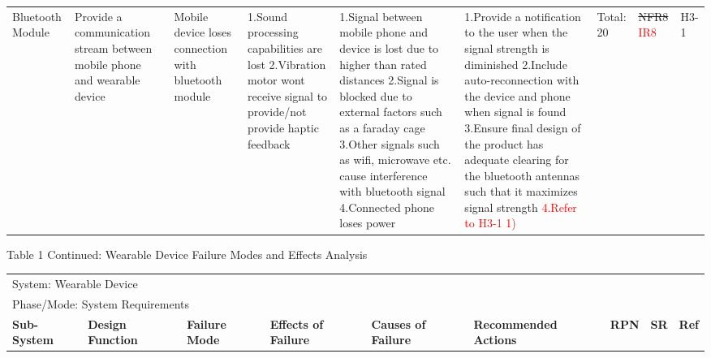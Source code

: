 \documentclass[12pt, titlepage]{article}
\begin{document}
\begin{landscape}
\begin{table}[H]
\begin{tabular}{| p{} | p{}  | p{} | p{} | p{} | p{} | p{} | p{} | p{} |}
         Bluetooth Module & Provide a communication stream between mobile phone and wearable device & Mobile device loses connection with  bluetooth module & 1.Sound processing capabilities are lost \newline 2.Vibration motor wont receive signal to provide/not provide haptic feedback  & 1.Signal between mobile phone and  device is lost due to higher than rated distances \newline 2.Signal is blocked due to external factors such as a faraday cage \newline 3.Other signals such as wifi, microwave etc. cause interference with bluetooth signal \newline 4.Connected phone loses power  & 1.Provide a notification to the user when the signal strength is diminished \newline 2.Include auto-reconnection with the device and phone when signal is found \newline 3.Ensure final design of the product has adequate clearing for the bluetooth antennas such that it maximizes signal strength \newline \textcolor{red}{4.Refer to H3-1 1)}  &  Total: 20 & \sout{NFR8} \textcolor{red}{IR8} & H3-1 \\ \cline{1-9}
        
        \end{tabular}

\end{table}

\begin{table}[H]
    \centering
        Table 1 Continued: Wearable Device Failure Modes and Effects Analysis

        \begin{tabular}{| p{} | p{}  | p{} | p{} | p{} | p{} | p{} | p{} | p{} |}
            \hline
        
        \multicolumn{9}{|l|}{System: Wearable Device} \\
        \multicolumn{9}{|l|}{Phase/Mode: System Requirements} \\ \hline
        \textbf{Sub-System} & \textbf{Design Function} & \textbf{Failure Mode} & \textbf{Effects of Failure} & \textbf{Causes of Failure} & \textbf{Recommended Actions} & \textbf{RPN} & \textbf{SR} & \textbf{Ref} \\ \hline


\end{tabular}
\end{table}
\end{landscape}
\end{document}
